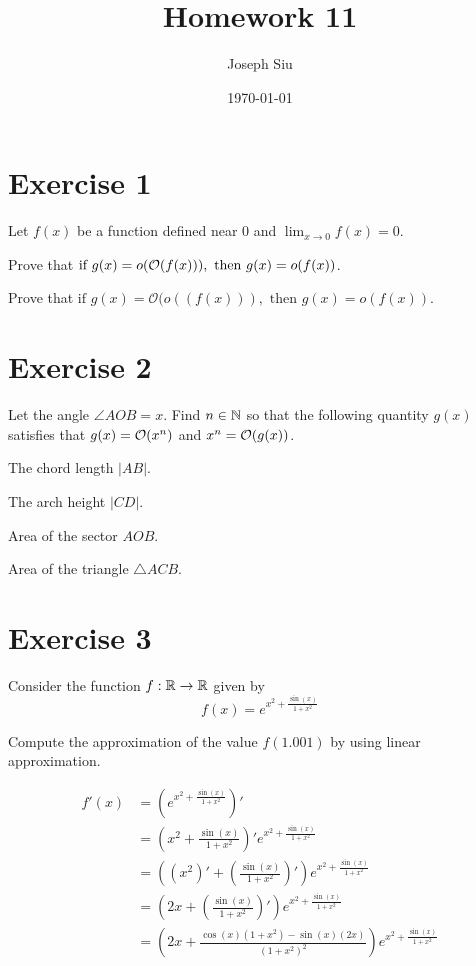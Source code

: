 \documentclass{homework}
\author{Joseph Siu}
\date{\today}
\title{Homework 11}
\newcommand{\R}{\bb{R}} %
\newcommand{\N}{\bb{N}} %
\newcommand{\?}{\stackrel{?}{=}}
\theoremstyle{definition}
\begin{document}
 \maketitle

\section*{Exercise 1}

Let $f(x)$ be a function defined near 0 and $\displaystyle\lim_{x\to0}f(x)=0$.

\question[1] Prove that $\textup{if~}g(x)=o(\mathcal{O}(f(x))),\mathrm{~then~}g(x)=o(f(x))$. 

\question[2] Prove that $\text{if~}g(x)=\mathcal{O}(o((f(x))),\text{~then~}g(x)=o(f(x))$.

\newpage
\section*{Exercise 2}
Let the angle $\angle AOB=x$. Find $n\in\N$ so that the following quantity $g(x)$ satisfies that $g(x)=\cal{O}(x^n)$ and $x^n=\cal{O}(g(x))$.


\question[1] The chord length $|AB|$.

\question[2] The arch height $|CD|$.

\question[3] Area of the sector $AOB$.

\question[4] Area of the triangle $\triangle ACB$.



\newpage
\section*{Exercise 3}

Consider the function $f:\R\to\R$ given by \[f(x)=e^{x^2+\frac{\sin(x)}{1+x^2}}\]

\question[1] Compute the approximation of the value $f(1.001)$ by using linear approximation.

\begin{align*}
    f'(x)&=(e^{x^2+\frac{\sin(x)}{1+x^2}})'\\
    &=(x^2+\frac{\sin(x)}{1+x^2})'e^{x^2+\frac{\sin(x)}{1+x^2}}\\
    &=((x^2)'+(\frac{\sin(x)}{1+x^2})')e^{x^2+\frac{\sin(x)}{1+x^2}}\\
    &=(2x+(\frac{\sin(x)}{1+x^2})')e^{x^2+\frac{\sin(x)}{1+x^2}}\\
    &=(2x+\frac{\cos(x)(1+x^2)-\sin(x)(2x)}{(1+x^2)^2})e^{x^2+\frac{\sin(x)}{1+x^2}}\\
\end{align*}
\end{document}
